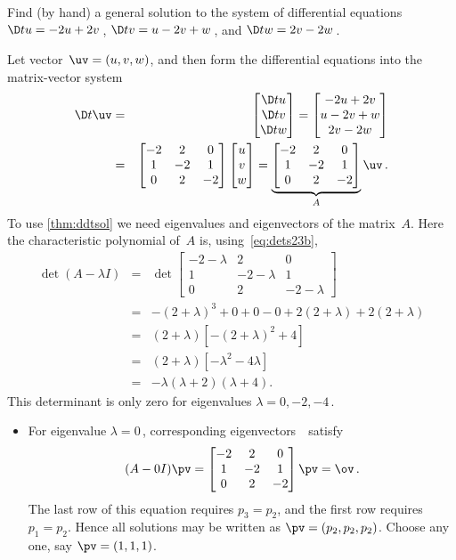 \begin{example} \label{eg:de3t} 
Find (by hand) a general solution to the system of differential equations \(\D tu=-2u+2v\)\,, \(\D tv=u-2v+w\)\,, and \(\D tw=2v-2w\)\,.

\begin{solution} 
Let vector~\(\uv=(u,v,w)\), and then form the differential equations into the matrix-vector system
\begin{eqnarray*}
\D t\uv&=&\begin{bmatrix} \D tu\\\D tv\\\D t w \end{bmatrix}
=\begin{bmatrix} -2u+2v\\u-2v+w\\2v-2w \end{bmatrix}
\\&=&\begin{bmatrix} -2&2&0\\1&-2&1\\0&2&-2 \end{bmatrix}
\begin{bmatrix} u\\v\\w \end{bmatrix}
=\underbrace{\begin{bmatrix} -2&2&0\\1&-2&1\\0&2&-2 \end{bmatrix}}_A\uv\,.
\end{eqnarray*}
To use \autoref{thm:ddtsol} we need eigenvalues and eigenvectors of the matrix~\(A\).
Here the characteristic polynomial of~\(A\) is, using~\eqref{eq:dets23b},
\begin{eqnarray*}
\det(A-\lambda I)&=&\det\begin{bmatrix} -2-\lambda&2&0\\1&-2-\lambda&1\\0&2&-2-\lambda \end{bmatrix}
\\&=&-(2+\lambda)^3+0+0-0+2(2+\lambda)+2(2+\lambda)
\\&=&(2+\lambda)\left[-(2+\lambda)^2+4\right]
\\&=&(2+\lambda)[-\lambda^2-4\lambda]
\\&=&-\lambda(\lambda+2)(\lambda+4).
\end{eqnarray*}
This determinant is only zero for eigenvalues \(\lambda=0,-2,-4\)\,.
\begin{itemize}
\item For eigenvalue \(\lambda=0\)\,, corresponding eigenvectors~\pv\ satisfy
\begin{equation*}
(A-0I)\pv=\begin{bmatrix} -2&2&0\\1&-2&1\\0&2&-2 \end{bmatrix}\pv=\ov\,.
\end{equation*}
The last row of this equation requires \(p_3=p_2\), and the first row requires \(p_1=p_2\).
Hence all solutions may be written as \(\pv=(p_2,p_2,p_2)\).
Choose any one, say \(\pv=(1,1,1)\).


\end{itemize}
\end{solution}
\end{example}
